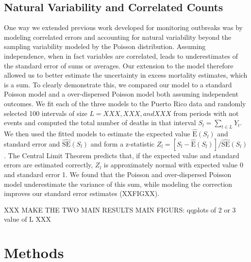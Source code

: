 \documentclass[11pt]{article}
\begin{document}
\subsection{Natural Variability and Correlated Counts}
\label{subsec:natural-variability}
One way we extended previous work developed for monitoring outbreaks \cite{farrington1996statistical,hohle2008count,noufaily2013improved,salmon2016monitoring} was by modeling correlated errors and accounting for natural variability beyond the sampling variability modeled by the Poisson distribution. Assuming independence, when in fact variables are correlated, leads to underestimates of the standard error of sums or averages. Our extension to the model therefore allowed us to better estimate the uncertainty in excess mortality estimates, which is a sum. To clearly demonstrate this, we compared our model to a standard Poisson model and a over-dispersed Poisson model both assuming independent outcomes. We fit each of the three models to the Puerto Rico data and randomly selected 100 intervals of size $L = XXX, XXX, and XXX$ from periods with not events and computed the total number of deaths in that interval $S_l = \sum_{t \in L} Y_t$. We then used the fitted models to estimate the expected value $\hat{\mbox{E}}(S_l)$ and standard error  and $\hat{\mbox{SE}}(S_l)$ and form a z-statistic $Z_l = [S_l - \hat{\mbox{E}}(S_l)]/\hat{\mbox{SE}}(S_l)$. The Central Limit Theorem predicts that, if the expected value and standard errors are estimated correctly, $Z_l$ is approximately normal with expected value 0 and standard error 1. We found that the Poisson and over-dispersed Poisson model underestimate the variance of this sum, while modeling the correction improves our standard error estimates (XXFIGXX). 

XXX MAKE THE TWO MAIN RESULTS MAIN FIGURS: qqplots of 2 or 3 value of L XXX

\section{Methods}
\label{sec:methods}
\end{document}
